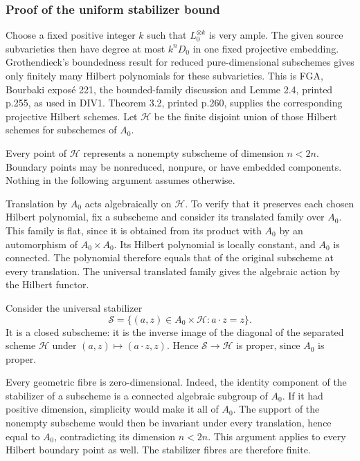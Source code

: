 \subsubsection{Proof of the uniform stabilizer bound}\label{proof-of-the-uniform-stabilizer-bound}

Choose a fixed positive integer \(k\) such that \(L_0^{\otimes k}\) is very ample. The given source subvarieties then have degree at most \(k^nD_0\) in one fixed projective embedding. Grothendieck's boundedness result for reduced pure-dimensional subschemes gives only finitely many Hilbert polynomials for these subvarieties. This is FGA, Bourbaki exposé 221, the bounded-family discussion and Lemme 2.4, printed p.255, as used in DIV1. Theorem 3.2, printed p.260, supplies the corresponding projective Hilbert schemes. Let \(\mathcal H\) be the finite disjoint union of those Hilbert schemes for subschemes of \(A_0\).

Every point of \(\mathcal H\) represents a nonempty subscheme of dimension \(n<2n\). Boundary points may be nonreduced, nonpure, or have embedded components. Nothing in the following argument assumes otherwise.

Translation by \(A_0\) acts algebraically on \(\mathcal H\). To verify that it preserves each chosen Hilbert polynomial, fix a subscheme and consider its translated family over \(A_0\). This family is flat, since it is obtained from its product with \(A_0\) by an automorphism of \(A_0\times A_0\). Its Hilbert polynomial is locally constant, and \(A_0\) is connected. The polynomial therefore equals that of the original subscheme at every translation. The universal translated family gives the algebraic action by the Hilbert functor.

Consider the universal stabilizer \[
 \mathcal S=\{(a,z)\in A_0\times\mathcal H:a\cdot z=z\}.
\tag{B21.4}
\] It is a closed subscheme: it is the inverse image of the diagonal of the separated scheme \(\mathcal H\) under \((a,z)\mapsto(a\cdot z,z)\). Hence \(\mathcal S\to\mathcal H\) is proper, since \(A_0\) is proper.

Every geometric fibre is zero-dimensional. Indeed, the identity component of the stabilizer of a subscheme is a connected algebraic subgroup of \(A_0\). If it had positive dimension, simplicity would make it all of \(A_0\). The support of the nonempty subscheme would then be invariant under every translation, hence equal to \(A_0\), contradicting its dimension \(n<2n\). This argument applies to every Hilbert boundary point as well. The stabilizer fibres are therefore finite.


